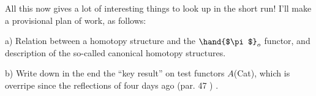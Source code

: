 All this now gives a lot of interesting things to look up in the
short run!  I'll make a provisional plan of work, as follows:

a)  Relation between a homotopy structure and the $\hand{$\pi$}_{o}$ functor,  and
description of the so-called canonical homotopy structures.

b)  Write down in the end the ``key result'' on test functors $A$\hand{$\rightarrow$}(Cat),
which  is overripe since the reflections  of four days ago (par. 47 ) .

